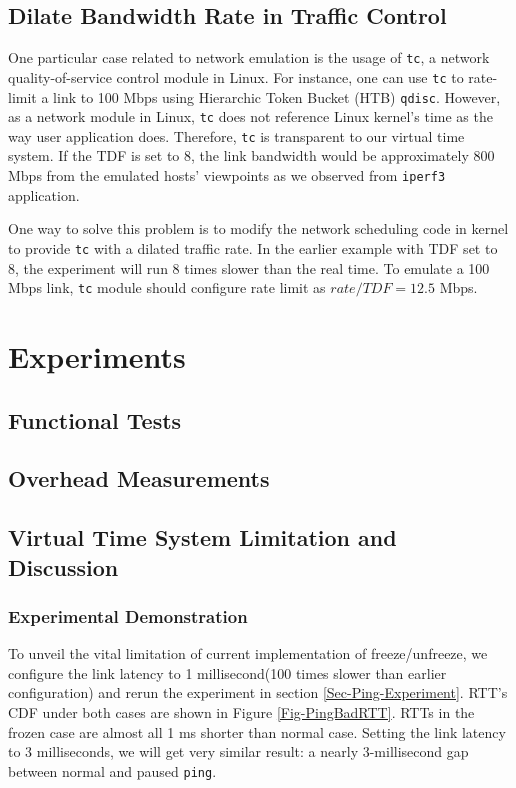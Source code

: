 \documentclass{acm_proc_article-sp}
\begin{document}
\subsection{Dilate Bandwidth Rate in Traffic Control}
One particular case related to network emulation is the usage of \texttt{tc}, a network quality-of-service control module in Linux\cite{trafficcontrol}. 
For instance, one can use \texttt{tc} to rate-limit a link to 100 Mbps using Hierarchic Token Bucket (HTB) \texttt{qdisc}. 
However, as a network module in Linux, \texttt{tc} does not reference Linux kernel's time as the way user application does. 
Therefore, \texttt{tc} is transparent to our virtual time system. 
If the TDF is set to 8, the link bandwidth would be approximately 800 Mbps from the emulated hosts' viewpoints as we observed from \texttt{iperf3} application.

One way to solve this problem is to modify the network scheduling code in kernel to provide \texttt{tc} with a dilated traffic rate. 
In the earlier example with TDF set to 8, the experiment will run 8 times slower than the real time. To emulate a 100 Mbps link, \texttt{tc} module should configure rate limit as $rate/TDF=12.5$ Mbps. 

\section{Experiments}
\subsection{Functional Tests}
\subsection{Overhead Measurements}

\subsection{Virtual Time System Limitation and Discussion}

\subsubsection{Experimental Demonstration}
To unveil the vital limitation of current implementation of freeze/unfreeze, we configure the link latency to 1 millisecond(100 times slower than earlier configuration) and rerun the experiment in section \ref{Sec-Ping-Experiment}.
RTT's CDF under both cases are shown in Figure \ref{Fig-PingBadRTT}.
RTTs in the frozen case are almost all 1 ms shorter than normal case.
Setting the link latency to 3 milliseconds, we will get very similar result: a nearly 3-millisecond gap between normal and paused \texttt{ping}.
\end{document}
